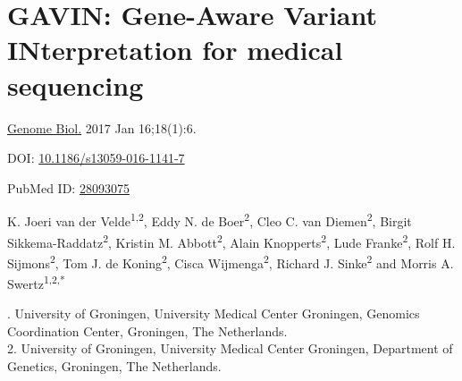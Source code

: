 \chapter[Variant interpretation for medical sequencing]{GAVIN: Gene-Aware Variant INterpretation for medical sequencing}
\label{chap:gavin}

{ \Large {} }

\hfill \underline{Genome Biol.} 2017 Jan 16;18(1):6.

\hfill DOI: \href{https://doi.org/10.1186/s13059-016-1141-7}{10.1186/s13059-016-1141-7}

\hfill PubMed ID: \href{https://www.ncbi.nlm.nih.gov/pubmed/28093075}{28093075}

\newpage

\noindent
K. Joeri van der Velde\textsuperscript{1,2}, Eddy N. de Boer\textsuperscript{2}, Cleo C. van Diemen\textsuperscript{2}, Birgit Sikkema-Raddatz\textsuperscript{2}, Kristin M. Abbott\textsuperscript{2}, Alain Knopperts\textsuperscript{2}, Lude Franke\textsuperscript{2}, Rolf H. Sijmons\textsuperscript{2}, Tom J. de Koning\textsuperscript{2}, Cisca Wijmenga\textsuperscript{2}, Richard J. Sinke\textsuperscript{2} and Morris A. Swertz\textsuperscript{1,2,*}

. University of Groningen, University Medical Center Groningen, Genomics Coordination Center, Groningen, The Netherlands.\\
2. University of Groningen, University Medical Center Groningen, Department of Genetics, Groningen, The Netherlands.\\

